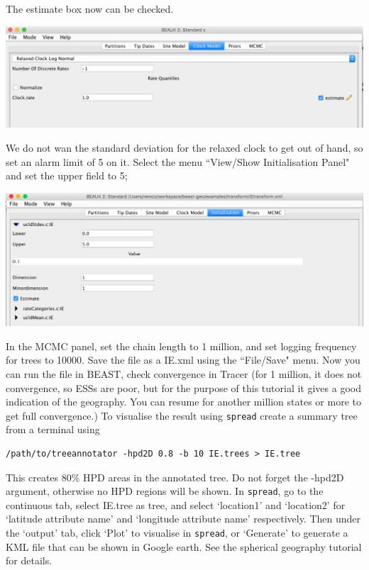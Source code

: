 \documentclass{article}
\begin{document}
The estimate box now can be checked.

\begin{center}
\includegraphics[scale=0.4]{figures/BEAUti_transform6}
\end{center}

We do not wan the standard deviation for the relaxed clock to get out of hand, so set an alarm limit of 5 on it. Select the menu ``View/Show Initialisation Panel" and set the upper field to 5;

\begin{center}
\includegraphics[scale=0.4]{figures/BEAUti_transform7} 
\end{center}

In the MCMC panel, set the chain length to 1 million, and set logging frequency for trees to 10000. Save the file as a IE.xml using the ``File/Save" menu. Now you can run the file in BEAST, check convergence in Tracer (for 1 million, it does not convergence, so ESSs are poor, but for the purpose of this tutorial it gives a good indication of the geography. You can resume for another million states or more to get full convergence.) To visualise the result using {\tt spread} create a summary tree from a terminal using
\begin{verbatim}
/path/to/treeannotator -hpd2D 0.8 -b 10 IE.trees > IE.tree
\end{verbatim}
This creates 80\% HPD areas in the annotated tree. Do not forget the -hpd2D argument, otherwise no HPD regions will be shown. 
In {\tt spread}, go to the continuous tab, select IE.tree as tree, and select `location1' and `location2' for `latitude attribute name' and `longitude attribute name' respectively. Then under the `output' tab, click `Plot' to visualise in {\tt spread}, or `Generate' to generate a KML file that can be shown in Google earth. See the spherical geography tutorial for details.
\end{document}
